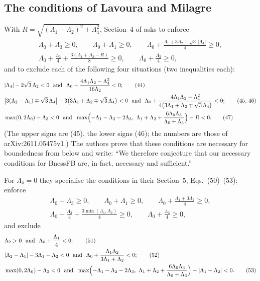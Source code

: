 \documentclass[11pt,a4paper]{amsart}
\theoremstyle{remark}
\newcommand{\La}{\Lambda}
\begin{document}
\subsection*{The conditions of Lavoura and Milagre}
With $R=\sqrt{(\La_1-\La_2)^2+\La_4^2}$, Section~4 of \cite{LM} asks to enforce
\begin{equation}\label{LMa}\tag{43}
\begin{gathered}
\La_0+\La_3\ge0,\qquad \La_0+\La_1\ge0,\qquad \La_0+\frac{\La_1+3\La_2-\sqrt3\,|\La_4|}{4}\ge0,\\
\La_0+\frac{\La_3}{4}+\frac{3(\La_1+\La_2-R)}{8}\ge0,\qquad \La_0+\frac{\La_3}{4}\ge0,
\end{gathered}
\end{equation}
and to exclude each of the following four situations (two inequalities each):
\begin{align}
&|\La_4|-2\sqrt3\,\La_2<0 \ \text{ and }\ \La_0+\frac{4\La_1\La_2-\La_4^2}{16\La_2}<0;\tag{44}\\
&\bigl|3(\La_2-\La_1)\mp\sqrt3\,\La_4\bigr|-3\bigl(3\La_1+\La_2\mp\sqrt3\,\La_4\bigr)<0 \ \text{ and }\
\La_0+\frac{4\La_1\La_2-\La_4^2}{4\bigl(3\La_1+\La_2\mp\sqrt3\,\La_4\bigr)}<0;\tag{45, 46}\\
&\max(0,2\La_0)-\La_3<0 \ \text{ and }\
\max\Bigl(-\La_1-\La_2-2\La_3,\ \La_1+\La_2+\frac{6\La_0\La_3}{\La_0+\La_3}\Bigr)-R<0.\tag{47}
\end{align}
(The upper signs are (45), the lower signs (46); the numbers are those of arXiv:2611.05475v1.)
The authors prove that these conditions are necessary for boundedness from below and write: ``We therefore
conjecture that our necessary conditions for BnessFB are, in fact, necessary and sufficient.''

For $\La_4=0$ they specialise the conditions in their Section~5, Eqs.~(50)--(53): enforce
\begin{equation}\tag{50}
\begin{gathered}
\La_0+\La_3\ge0,\qquad \La_0+\La_1\ge0,\qquad \La_0+\frac{\La_1+3\La_2}{4}\ge0,\\
\La_0+\frac{\La_3}{4}+\frac{3\min(\La_1,\La_2)}{4}\ge0,\qquad \La_0+\frac{\La_3}{4}\ge0,
\end{gathered}
\end{equation}
and exclude
\begin{align}
&\La_2>0 \ \text{ and }\ \La_0+\frac{\La_1}{4}<0;\tag{51}\\
&|\La_2-\La_1|-3\La_1-\La_2<0 \ \text{ and }\ \La_0+\frac{\La_1\La_2}{3\La_1+\La_2}<0;\tag{52}\\
&\max(0,2\La_0)-\La_3<0 \ \text{ and }\
\max\Bigl(-\La_1-\La_2-2\La_3,\ \La_1+\La_2+\frac{6\La_0\La_3}{\La_0+\La_3}\Bigr)-|\La_1-\La_2|<0.\tag{53}
\end{align}
\end{document}
